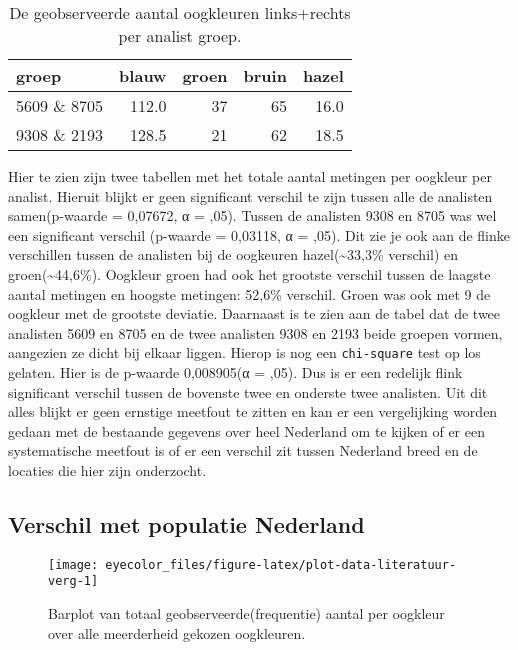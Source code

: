 \documentclass[
]{article}
\begin{document}
\begin{longtable}[t]{l|r|r|r|r}
\caption{\label{tab:eye-color-analist-group}De geobserveerde aantal oogkleuren links+rechts per analist groep.}\\
\hline
groep & blauw & groen & bruin & hazel\\
\hline
5609 \& 8705 & 112.0 & 37 & 65 & 16.0\\
\hline
9308 \& 2193 & 128.5 & 21 & 62 & 18.5\\
\hline
\end{longtable}

Hier te zien zijn twee tabellen met het totale aantal metingen per
oogkleur per analist. Hieruit blijkt er geen significant verschil te
zijn tussen alle de analisten samen(p-waarde = 0,07672, α = ,05). Tussen
de analisten 9308 en 8705 was wel een significant verschil (p-waarde =
0,03118, α = ,05). Dit zie je ook aan de flinke verschillen tussen de
analisten bij de oogkeuren hazel(\textasciitilde33,3\% verschil) en groen(\textasciitilde44,6\%).
Oogkleur groen had ook het grootste verschil tussen de laagste aantal
metingen en hoogste metingen: 52,6\% verschil. Groen was ook met 9 de
oogkleur met de grootste deviatie. Daarnaast is te zien aan de tabel dat
de twee analisten 5609 en 8705 en de twee analisten 9308 en 2193 beide
groepen vormen, aangezien ze dicht bij elkaar liggen. Hierop is nog een
\texttt{chi-square} test op los gelaten. Hier is de p-waarde 0,008905(α = ,05).
Dus is er een redelijk flink significant verschil tussen de bovenste
twee en onderste twee analisten. Uit dit alles blijkt er geen ernstige
meetfout te zitten en kan er een vergelijking worden gedaan met de
bestaande gegevens over heel Nederland om te kijken of er een
systematische meetfout is of er een verschil zit tussen Nederland breed
en de locaties die hier zijn onderzocht.

\hypertarget{verschil-met-populatie-nederland}{%
\subsection{Verschil met populatie Nederland}\label{verschil-met-populatie-nederland}}

\begin{figure}
\texttt{[image: eyecolor\_files/figure-latex/plot-data-literatuur-verg-1]} \caption{Barplot van totaal geobserveerde(frequentie) aantal per oogkleur over alle meerderheid gekozen oogkleuren.}\label{fig:plot-data-literatuur-verg}
\end{figure}
\end{document}
